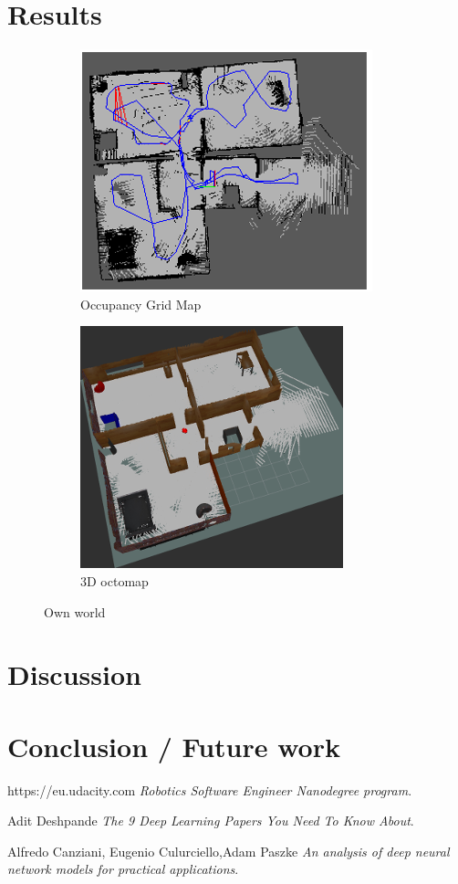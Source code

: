 \documentclass[10pt,journal,compsoc]{IEEEtran}
\begin{document}
\section{Results}


\begin{figure}[h]
\centering
\begin{subfigure}[b]{0.2\textwidth}
\includegraphics[scale=0.3]{own-occupancy-grid-map}
\caption{Occupancy Grid Map}
\end{subfigure}
\begin{subfigure}[b]{0.2\textwidth}
\includegraphics[scale=0.3]{own-3d-map}
\caption{3D octomap}
\end{subfigure}
\caption{Own world}
\end{figure}








\section{Discussion}
\section{Conclusion / Future work}

\begin{thebibliography}{9}


https://eu.udacity.com
\textit{Robotics Software Engineer Nanodegree program}. 

Adit Deshpande
\textit{The 9 Deep Learning Papers You Need To Know About}. 

Alfredo Canziani, Eugenio Culurciello,Adam Paszke  
\textit{An analysis of deep neural network models for practical applications}. 
\end{thebibliography}
\end{document}
